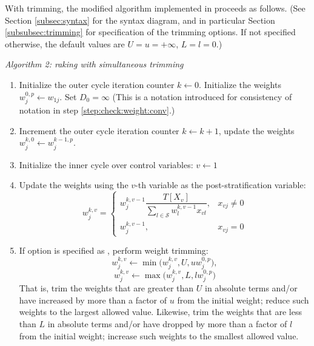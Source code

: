With trimming, the modified algorithm implemented in
 proceeds as follows.
(See Section \ref{subsec:syntax} for the syntax diagram, and in particular
Section \ref{subsubsec:trimming} for specification of
the trimming options. If not specified otherwise, the default values
are $U=u=+\infty$, $L=l=0$.)


{\it Algorithm 2: raking with simultaneous trimming}

\begin{enumerate}
    \item Initialize the outer cycle iteration counter $k\leftarrow 0$.
          Initialize the weights $w_j^{0,p} \leftarrow w_{1j}$.
          Set $D_0 = \infty$ (This is a notation introduced for consistency 
          of notation in step  \ref{step:check:weight:conv}.)
    \item Increment the outer cycle iteration counter $k \leftarrow k+1$,
          update the weights $w_j^{k,0} \leftarrow w_j^{k-1,p}$.
          \label{step:next:cycle}
    \item Initialize the inner cycle over control variables: $v \leftarrow 1$
    \item Update the weights using the $v$-th variable
        as the post-stratification variable:
        $$
            w_j^{k,v} =
                \left\{
                \begin{array}{ll}
                    w_j^{k,v-1} \dfrac{ T[X_v] }{ \sum_{l \in \mathcal{S}} w_l^{k,v-1} x_{vl} },
                        & x_{vj} \neq 0 \\
                    w_j^{k,v-1},
                        & x_{vj} = 0
                \end{array}
                \right.
          $$
          \label{step:update:weights}
    \item If  option is specified as ,
        perform weight trimming:
        $$
            w_j^{k,v} \leftarrow \min\bigl( w_j^{k,v}, U, u w_j^{0,p} \bigr),
        $$
        $$
            w_j^{k,v} \leftarrow \max\bigl( w_j^{k,v}, L, l w_j^{0,p} \bigr)
        $$
        That is, trim the weights that are greater than $U$ in absolute terms and/or
        have increased by more than a factor of $u$ from the initial weight; reduce such weights
        to the largest allowed value. Likewise, trim the weights that are less than $L$
        in absolute terms and/or have dropped by more than a factor of $l$ from the initial
        weight; increase such weights to the smallest allowed value.

\end{enumerate}
